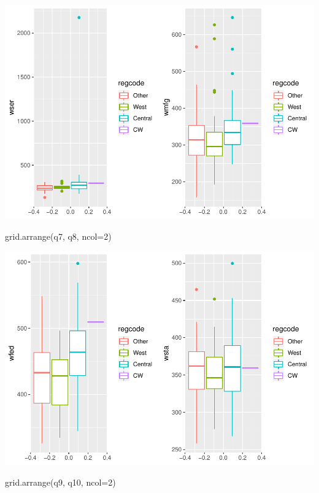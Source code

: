 \documentclass[]{article}
\newenvironment{Shaded}{}{}
\newcommand{\DataTypeTok}[1]{#1}
\newcommand{\DecValTok}[1]{#1}
\newcommand{\KeywordTok}[1]{\textcolor[rgb]{0.00,0.00,1.00}{#1}}
\newcommand{\NormalTok}[1]{#1}
\begin{document}
\includegraphics{Bagnard_Gaustad_Hartman_Leung_Lab_3_files/figure-latex/unnamed-chunk-15-3.pdf}

\begin{Shaded}
\begin{Highlighting}[]
\KeywordTok{grid.arrange}\NormalTok{(q7, q8, }\DataTypeTok{ncol=}\DecValTok{2}\NormalTok{)}
\end{Highlighting}
\end{Shaded}

\includegraphics{Bagnard_Gaustad_Hartman_Leung_Lab_3_files/figure-latex/unnamed-chunk-15-4.pdf}

\begin{Shaded}
\begin{Highlighting}[]
\KeywordTok{grid.arrange}\NormalTok{(q9, q10, }\DataTypeTok{ncol=}\DecValTok{2}\NormalTok{)}
\end{Highlighting}
\end{Shaded}
\end{document}

